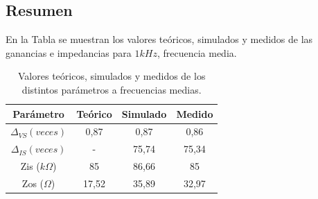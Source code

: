 \subsection{Resumen}

En la Tabla \label{valores_frec_media} se muestran los valores teóricos, simulados y medidos de las ganancias e impedancias para $1kHz$, frecuencia media.

	\begin{table}[H]
		\centering
		\begin{tabular}{c c c c }
		\hline
		Parámetro   	   & Teórico & Simulado & Medido \\ \hline
		$\Delta _{VS} (veces)$ 	   & 0,87    & 0,87     & 0,86   \\%
		$\Delta_{IS} (veces)$	   & -      & 75,74    & 75,34  \\ %
		Zis ($k\Omega$)  & 85      & 86,66    & 85     \\ %
		Zos  ($\Omega$) & 17,52   & 35,89    & 32,97  \\ \hline
		\end{tabular}
		\caption{Valores teóricos, simulados y medidos de los distintos parámetros a frecuencias medias.}
		\label{valores_frec_media}
	\end{table}
